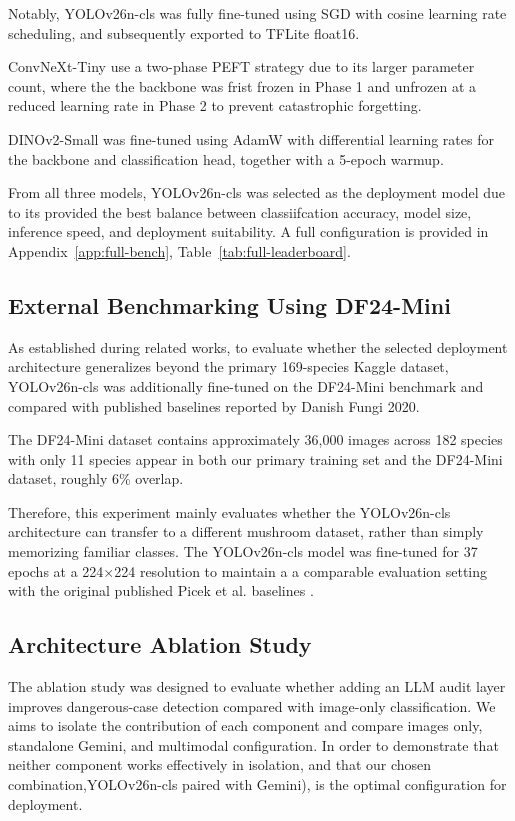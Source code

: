 \documentclass[journal,transmag]{IEEEtran}
\begin{document}
Notably, YOLOv26n-cls was fully fine-tuned using SGD with cosine learning rate scheduling, and subsequently exported to TFLite float16. 

ConvNeXt-Tiny use a two-phase PEFT strategy due to its larger parameter count, where the the backbone was frist frozen in Phase 1 and unfrozen at a reduced learning rate in Phase 2 to prevent catastrophic forgetting. 

DINOv2-Small was fine-tuned using AdamW with differential learning rates for the backbone and classification head, together with a 5-epoch warmup.

From all three models, YOLOv26n-cls was selected as the deployment model due to its provided the best balance between classiifcation accuracy, model size, inference speed, and deployment suitability. A full configuration is provided in 
Appendix~\ref{app:full-bench}, 
Table~\ref{tab:full-leaderboard}.  


\subsection{\textbf{External Benchmarking Using DF24-Mini}} 
As established during related works, to evaluate whether the selected deployment architecture generalizes beyond the primary 169-species Kaggle dataset, YOLOv26n-cls was additionally fine-tuned on the DF24-Mini benchmark\cite{picek2022danishfungi} and compared with published baselines reported by Danish Fungi 2020\cite{picek2025fungitastic}. 

The DF24-Mini dataset contains approximately 36,000 images across 182 species with only 11 species appear in both our primary training set and the DF24-Mini dataset, roughly 6\% overlap. 

Therefore, this experiment mainly evaluates whether the YOLOv26n-cls architecture can transfer to a different mushroom dataset, rather than simply memorizing familiar classes. The YOLOv26n-cls model was fine-tuned for 37 epochs at a 224$\times$224 resolution to maintain a a comparable evaluation setting with the original published Picek et al. baselines \cite{picek2025fungitastic}.

\subsection{\textbf{Architecture Ablation Study}}
The ablation study was designed to evaluate whether adding an LLM audit layer improves dangerous-case detection compared with image-only classification. We aims to isolate the contribution of each component and compare images only, standalone Gemini, and multimodal configuration. In order to demonstrate that neither component works effectively in isolation, and that our chosen combination,YOLOv26n-cls paired with Gemini), is the optimal configuration for deployment. 
\end{document}
